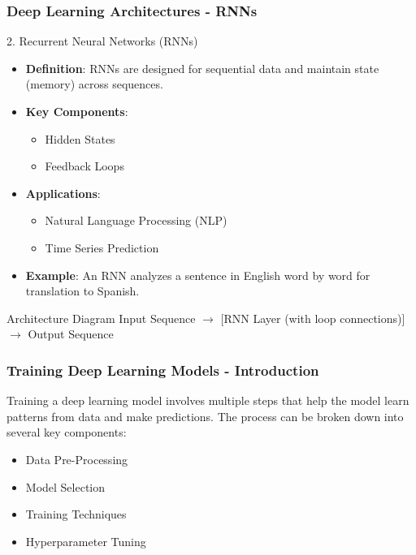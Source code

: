 \documentclass{beamer}
\begin{document}
\begin{frame}[fragile]
    \frametitle{Deep Learning Architectures - RNNs}
    \begin{block}{2. Recurrent Neural Networks (RNNs)}
        \begin{itemize}
            \item \textbf{Definition}: RNNs are designed for sequential data and maintain state (memory) across sequences.
            \item \textbf{Key Components}:
            \begin{itemize}
                \item Hidden States
                \item Feedback Loops
            \end{itemize}
            \item \textbf{Applications}:
            \begin{itemize}
                \item Natural Language Processing (NLP)
                \item Time Series Prediction
            \end{itemize}
            \item \textbf{Example}: An RNN analyzes a sentence in English word by word for translation to Spanish.
        \end{itemize}
    \end{block}
    \begin{block}{Architecture Diagram}
        Input Sequence $\rightarrow$ [RNN Layer (with loop connections)] $\rightarrow$ Output Sequence
    \end{block}
\end{frame}

\begin{frame}[fragile]
    \frametitle{Training Deep Learning Models - Introduction}
    Training a deep learning model involves multiple steps that help the model learn patterns from data and make predictions. The process can be broken down into several key components:
    \begin{itemize}
        \item Data Pre-Processing
        \item Model Selection
        \item Training Techniques
        \item Hyperparameter Tuning
    \end{itemize}
\end{frame}
\end{document}
